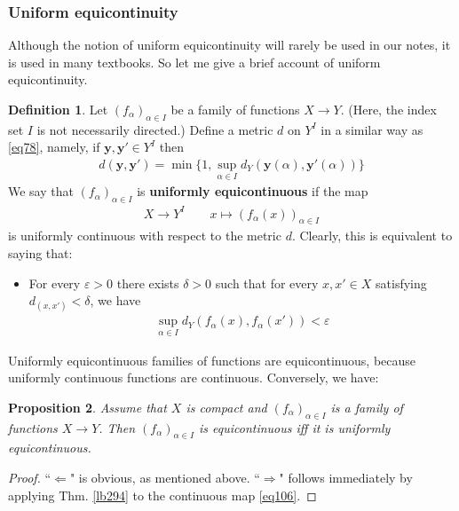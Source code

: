 \documentclass[12pt,b5paper,notitlepage]{article}
\theoremstyle{definition}
\newtheorem{df}{Definition}[section]
\theoremstyle{plain}
\newtheorem{pp}[df]{Proposition}
\newcommand{\mbf}{\mathbf}
\newcommand{\eps}{\varepsilon}
\numberwithin{equation}{section}
\begin{document}
\subsubsection{Uniform equicontinuity}

Although the notion of uniform equicontinuity will rarely be used in our notes, it is used in many textbooks.  So let me give a brief account of uniform equicontinuity. 



\begin{df}\label{lb316}
Let $(f_\alpha)_{\alpha\in I}$ be a family of functions $X\rightarrow Y$. (Here, the index set $I$ is not necessarily directed.) Define a metric $d$ on $Y^I$ in a similar way as \eqref{eq78}, namely, if $\mbf y,\mbf y'\in Y^I$ then
\begin{align*}
d(\mbf y,\mbf y')=\min\Big\{1,\sup_{\alpha\in I} d_Y(\mbf y(\alpha),\mbf  y'(\alpha))\Big\}
\end{align*}
We say that $(f_\alpha)_{\alpha\in I}$ is \textbf{uniformly equicontinuous}  if the map
\begin{gather}\label{eq106}
X\rightarrow Y^I\qquad x\mapsto (f_\alpha(x))_{\alpha\in I}
\end{gather}
is uniformly continuous with respect to the metric $d$. Clearly, this is equivalent to saying that:
\begin{itemize}
\item For every $\eps>0$ there exists $\delta>0$ such that for every $x,x'\in X$ satisfying $d_(x,x')<\delta$, we have
\begin{align*}
\sup_{\alpha\in I}d_Y(f_\alpha(x),f_\alpha(x'))<\eps
\end{align*}
\end{itemize}
\end{df}

Uniformly equicontinuous families of functions are equicontinuous, because uniformly continuous functions are continuous. Conversely, we have:

\begin{pp}
Assume that $X$ is compact and $(f_\alpha)_{\alpha\in I}$ is a family of functions $X\rightarrow Y$. Then $(f_\alpha)_{\alpha\in I}$ is equicontinuous iff it is uniformly equicontinuous.
\end{pp}

\begin{proof}
``$\Leftarrow$" is obvious, as mentioned above. ``$\Rightarrow$" follows immediately by applying Thm. \ref{lb294} to the continuous map \eqref{eq106}.
\end{proof}
\end{document}
